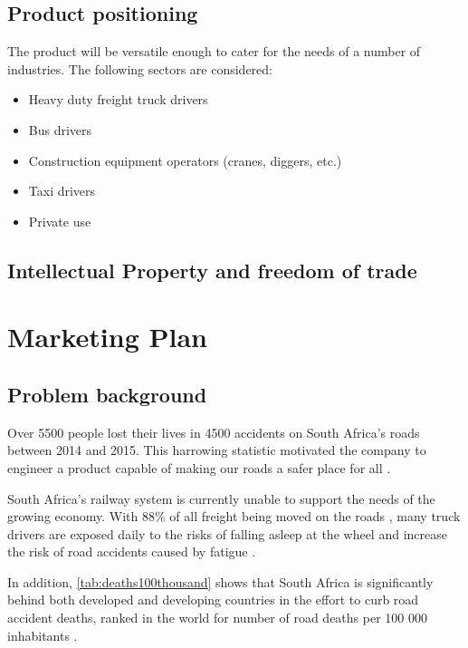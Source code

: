 \section{Product positioning}
The product will be versatile enough to cater for the needs of a number of industries. The following sectors are considered:
\begin{itemize}
\item Heavy duty freight truck drivers
\item Bus drivers
\item Construction equipment operators (cranes, diggers, etc.)
\item Taxi drivers
\item Private use
\end{itemize}

\section{Intellectual Property and freedom of trade}

\newpage
\chapter{Marketing Plan}
\section{Problem background}
Over 5500 people lost their lives in 4500 accidents on South Africa's roads between 2014 and 2015. This harrowing statistic motivated the company to engineer a product capable of making our roads a safer place for all \cite{EWNRoadDeaths}. 

South Africa's railway system is currently unable to support the needs of the growing economy. With 88\% of all freight being moved on the roads \cite{BDlive_freight}, many truck drivers are exposed daily to the risks of falling asleep at the wheel \cite{ArriveAliveDriverTiredness} and increase the risk of road accidents caused by fatigue \cite{News24TruckersSleeping}.

In addition, \cref{tab:deaths100thousand} shows that South Africa is significantly behind both developed and developing countries in the effort to curb road accident deaths, ranked  in the world for number of road deaths per 100 000 inhabitants \cite{deathsPer100thousandStats}.


